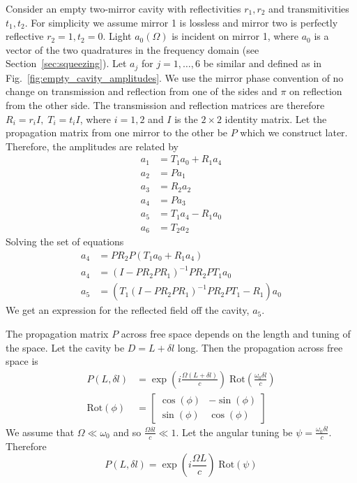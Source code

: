 \documentclass[aps,pra,superscriptaddress,reprint,nofootinbib]{revtex4-1}
\begin{document}
Consider an empty two-mirror cavity with reflectivities $r_1, r_2$ and transmitivities $t_1, t_2$. For simplicity we assume mirror 1 is lossless and mirror two is perfectly reflective $r_2 = 1, t_2 = 0$. Light $a_0(\Omega)$ is incident on mirror 1, where $a_0$ is a vector of the two quadratures in the frequency domain (see Section~\ref{sec:squeezing}). Let $a_j$ for $j = 1, \ldots, 6$ be similar and defined as in Fig.~\ref{fig:empty_cavity_amplitudes}. We use the mirror phase convention of no change on transmission and reflection from one of the sides and $\pi$ on reflection from the other side. The transmission and reflection matrices are therefore $R_i = r_i I,\; T_i = t_i I$, where $i = 1, 2$ and $I$ is the $2 \times 2$ identity matrix. Let the propagation matrix from one mirror to the other be $P$ which we construct later. Therefore, the amplitudes are related by
\begin{align*}
a_1 &= T_1 a_0 + R_1 a_4\\
a_2 &= P a_1\\
a_3 &= R_2 a_2 \\
a_4 &= P a_3\\
a_5 &= T_1 a_4 - R_1 a_0\\
a_6 &= T_2 a_2
\end{align*}
Solving the set of equations
\begin{align*}
a_4 &= P R_2 P (T_1 a_0 + R_1 a_4) \\
a_4 &= (I - P R_2 P R_1)^{-1} P R_2 P T_1 a_0 \\
a_5 &= \left(T_1 (I - P R_2 P R_1)^{-1} P R_2 P T_1 - R_1\right) a_0
\end{align*}
We get an expression for the reflected field off the cavity, $a_5$.


The propagation matrix $P$ across free space depends on the length and tuning of the space. Let the cavity be $D = L + \delta l$ long. Then the propagation across free space is
\begin{align*}
P(L, \delta l) &= \exp\left(i\frac{\Omega (L + \delta l)}{c}\right) \;\mathrm{Rot}\left(\frac{\omega_0 \delta l}{c}\right) \\
\mathrm{Rot}(\phi) &= \begin{bmatrix}
\cos(\phi) & -\sin(\phi)\\ 
\sin(\phi) & \cos(\phi)
\end{bmatrix}
\end{align*}
We assume that $\Omega \ll \omega_0$ and so $\frac{\Omega \delta l}{c} \ll 1$. Let the angular tuning be $\psi = \frac{\omega_0 \delta l}{c}$. Therefore $$P(L, \delta l) = \exp\left(i\frac{\Omega L}{c}\right) \;\mathrm{Rot}\left(\psi\right)$$
\end{document}
